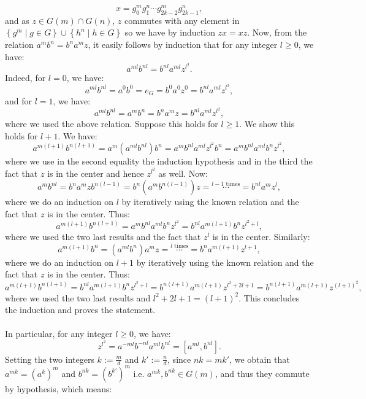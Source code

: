\begin{solution}
    \[
        x=g_0^m g_1^n \cdots g_{2k-2}^m g_{2k-1}^n,
    \]
    and as \( z\in G\left(m\right) \cap G\left(n\right) \), \( z \) commutes with any element in \( \left\{g^m \mid g\in G\right\}\cup\left\{h^n \mid h\in G\right\} \) so we have by induction \( zx=xz \). Now, from the relation \( a^m b^n = b^n a^m z \), it easily follows by induction that for any integer \( l\geq 0 \), we have:
    \[
        a^{ml} b^{nl}=b^{nl} a^{ml} z^{l^2}.
    \]
    Indeed, for \( l=0 \), we have:
    \[
        a^{ml} b^{nl}=a^{0} b^{0}=e_G=b^{0} a^{0} z^0=b^{nl} a^{ml} z^{l^2},
    \]
    and for \( l=1 \), we have:
    \[
        a^{ml} b^{nl}=a^{m} b^{n}=b^n a^m z=b^{nl} a^{ml} z^{l^2},
    \]
    where we used the above relation. Suppose this holds for \( l\geq 1 \). We show this holds for \( l+1 \). We have:
    \[
        a^{m\left(l+1\right)} b^{n\left(l+1\right)}=a^m \left(a^{ml}b^{nl}\right)b^n=a^m b^{nl} a^{ml} z^{l^2} b^n=a^m b^{nl} a^{ml} b^n z^{l^2},
    \]
    where we use in the second equality the induction hypothesis and in the third the fact that \( z \) is in the center and hence \( z^{l^2} \) as well. Now:
    \[
        a^m b^{nl}=b^n a^m z b^{n\left(l-1\right)}=b^n \left(a^m b^{n\left(l-1\right)}\right) z=\overset{l-1\text{ times}}{\cdots}=b^{nl} a^{m} z^{l},
    \]
    where we do an induction on \( l \) by iteratively using the known relation and the fact that \( z \) is in the center. Thus:
    \[
        a^{m\left(l+1\right)} b^{n\left(l+1\right)}=a^m b^{nl} a^{ml} b^n z^{l^2}=b^{nl} a^{m\left(l+1\right)} b^n z^{l^2+l},
    \]
    where we used the two last results and the fact that \( z^l \) is in the center. Similarly:
    \[
        a^{m\left(l+1\right)} b^{n}=\left(a^{ml} b^n\right) a^m z=\overset{l\text{ times}}{\cdots}=b^{n} a^{m\left(l+1\right)} z^{l+1},
    \]
    where we do an induction on \( l+1 \) by iteratively using the known relation and the fact that \( z \) is in the center. Thus:
    \[
        a^{m\left(l+1\right)} b^{n\left(l+1\right)}=b^{nl} a^{m\left(l+1\right)} b^n z^{l^2+l}=b^{n\left(l+1\right)} a^{m\left(l+1\right)} z^{l^2+2l+1}=b^{n\left(l+1\right)} a^{m\left(l+1\right)} z^{\left(l+1\right)^2},
    \]
    where we used the two last results and \( l^2+2l+1=\left(l+1\right)^2 \). This concludes the induction and proves the statement.
    \\\\
    In particular, for any integer \( l\geq 0 \), we have:
    \[
        z^{l^2}=a^{-ml} b^{-nl} a^{ml} b^{nl}=\left[a^{ml}, b^{nl}\right].
    \]
    Setting the two integers \( k := \frac{m}{d} \) and \( k':=\frac{n}{d} \), since \( nk=mk' \), we obtain that \( a^{mk}=\left(a^k\right)^{m} \) and \( b^{nk}=\left(b^{k'}\right)^{m} \) i.e. \( a^{mk},b^{nk}\in G\left(m\right) \), and thus they commute by hypothesis, which means:

\end{solution}
